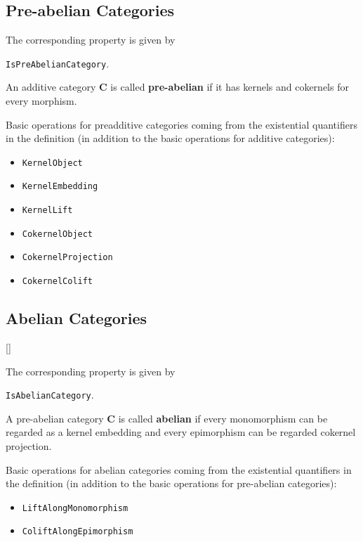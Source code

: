 \subsection{Pre-abelian Categories}

\begin{documentation}
 The corresponding \GAP property is given by
 \begin{center}
  \texttt{IsPreAbelianCategory}.  
 \end{center}
\end{documentation}

\begin{definition}
 An additive category $\mathbf{C}$ is called \textbf{pre-abelian} 
 if it has kernels and cokernels for every morphism.
\end{definition}

Basic operations for preadditive categories coming from the existential quantifiers
in the definition
(in addition to the basic operations for additive categories):
\begin{itemize}
 \item \texttt{KernelObject}
 \item \texttt{KernelEmbedding}
 \item \texttt{KernelLift}
 \item \texttt{CokernelObject}
 \item \texttt{CokernelProjection}
 \item \texttt{CokernelColift}
\end{itemize}


\subsection{Abelian Categories}[\cite{MLCWM}]

\begin{documentation}
 The corresponding \GAP property is given by
 \begin{center}
  \texttt{IsAbelianCategory}.  
 \end{center}
\end{documentation}

\begin{definition}
 A pre-abelian category $\mathbf{C}$ is called \textbf{abelian}
 if every monomorphism can be regarded as a kernel embedding
 and every epimorphism can be regarded cokernel projection.
\end{definition}

Basic operations for abelian categories coming from the existential quantifiers
in the definition
(in addition to the basic operations for pre-abelian categories):
\begin{itemize}
 \item \texttt{LiftAlongMonomorphism}
 \item \texttt{ColiftAlongEpimorphism}
\end{itemize}

